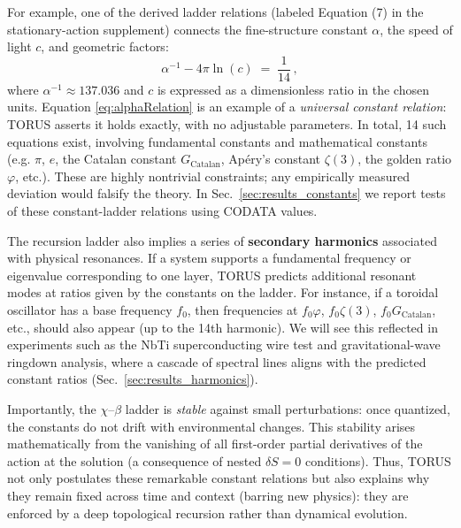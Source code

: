 \documentclass[12pt]{article}
\begin{document}
For example, one of the derived ladder relations (labeled Equation (7) in the stationary-action supplement) connects the fine-structure constant $\alpha$, the speed of light $c$, and geometric factors:
\begin{equation}
\alpha^{-1} - 4\pi \ln(c) \;=\; \frac{1}{14}\,,
\label{eq:alphaRelation}
\end{equation}
where $\alpha^{-1}\approx137.036$ and $c$ is expressed as a dimensionless ratio in the chosen units. Equation \eqref{eq:alphaRelation} is an example of a \emph{universal constant relation}: TORUS asserts it holds exactly, with no adjustable parameters. In total, 14 such equations exist, involving fundamental constants and mathematical constants (e.g. $\pi$, $e$, the Catalan constant $G_{\mathrm{Catalan}}$, Apéry’s constant $\zeta(3)$, the golden ratio $\varphi$, etc.). These are highly nontrivial constraints; any empirically measured deviation would falsify the theory. In Sec.~\ref{sec:results_constants} we report tests of these constant-ladder relations using CODATA values.

The recursion ladder also implies a series of \textbf{secondary harmonics} associated with physical resonances. If a system supports a fundamental frequency or eigenvalue corresponding to one layer, TORUS predicts additional resonant modes at ratios given by the constants on the ladder. For instance, if a toroidal oscillator has a base frequency $f_0$, then frequencies at $f_0 \varphi$, $f_0 \zeta(3)$, $f_0 G_{\mathrm{Catalan}}$, etc., should also appear (up to the 14th harmonic). We will see this reflected in experiments such as the NbTi superconducting wire test and gravitational-wave ringdown analysis, where a cascade of spectral lines aligns with the predicted constant ratios (Sec.~\ref{sec:results_harmonics}).

Importantly, the $\chi$–$\beta$ ladder is \emph{stable} against small perturbations: once quantized, the constants do not drift with environmental changes. This stability arises mathematically from the vanishing of all first-order partial derivatives of the action at the solution (a consequence of nested $\delta S=0$ conditions). Thus, TORUS not only postulates these remarkable constant relations but also explains why they remain fixed across time and context (barring new physics): they are enforced by a deep topological recursion rather than dynamical evolution.
\end{document}
